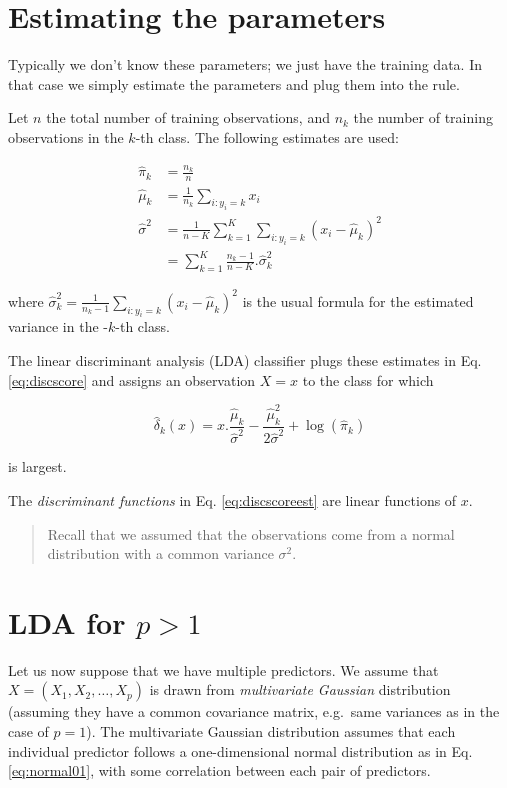 \documentclass[]{book}
\begin{document}
\section{Estimating the parameters}\label{estimating-the-parameters}

Typically we don't know these parameters; we just have the training
data. In that case we simply estimate the parameters and plug them into
the rule.

Let \(n\) the total number of training observations, and \(n_k\) the
number of training observations in the \(k\)-th class. The following
estimates are used:

\begin{align*}
\hat{\pi}_k &= \frac{n_k}{n} \\
\hat{\mu}_k &= \frac{1}{n_k} \sum_{i: y_i=k} x_i \\
\hat{\sigma}^2 &= \frac{1}{n - K} \sum_{k=1}^K \sum_{i: y_i=k} (x_i-\hat{\mu}_k)^2 \\
 &= \sum_{k=1}^K \frac{n_k-1}{n - K} . \hat{\sigma}_k^2
\end{align*}

where
\(\hat{\sigma}_k^2 = \frac{1}{n_k-1}\sum_{i: y_i=k}(x_i-\hat{\mu}_k)^2\)
is the usual formula for the estimated variance in the -\(k\)-th class.

The linear discriminant analysis (LDA) classifier plugs these estimates
in Eq. \eqref{eq:discscore} and assigns an observation \(X=x\) to the
class for which

\begin{equation}
\hat{\delta}_k(x) = x.\frac{\hat{\mu}_k}{\hat{\sigma}^2} - \frac{\hat{\mu}_k^2}{2\hat{\sigma}^2} + \log (\hat{\pi}_k)
\label{eq:discscoreest}
\end{equation}

is largest.

The \emph{discriminant functions} in Eq. \eqref{eq:discscoreest} are
linear functions of \(x\).

\begin{quote}
Recall that we assumed that the observations come from a normal
distribution with a common variance \(\sigma^2\).
\end{quote}

\section{\texorpdfstring{LDA for
\(p > 1\)}{LDA for p \textgreater{} 1}}\label{lda-for-p-1}

Let us now suppose that we have multiple predictors. We assume that
\(X=(X_1,X_2,\ldots,X_p)\) is drawn from \emph{multivariate Gaussian}
distribution (assuming they have a common covariance matrix, e.g.~same
variances as in the case of \(p=1\)). The multivariate Gaussian
distribution assumes that each individual predictor follows a
one-dimensional normal distribution as in Eq. \eqref{eq:normal01}, with
some correlation between each pair of predictors.
\end{document}
